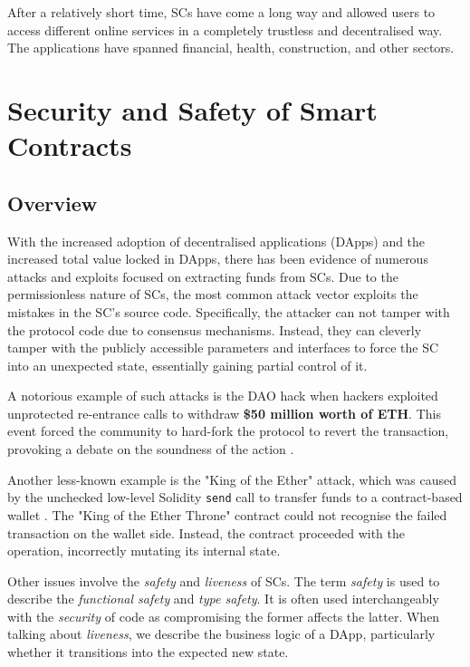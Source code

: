\documentclass[oneside]{ecsproject}     %
\begin{document}
After a relatively short time, SCs have come a long way and allowed users to access different online services in a completely trustless and decentralised way.
The applications have spanned financial, health, construction\cite{cad_blockchain}, and other sectors. 

\chapter{Security and Safety of Smart Contracts}

\section{Overview}

With the increased adoption of decentralised applications (DApps) and the increased total value locked in DApps, 
there has been evidence of numerous attacks and exploits focused on extracting funds from SCs. 
Due to the permissionless nature of SCs, the most common attack vector exploits the mistakes in the SC's source code.
Specifically, the attacker can not tamper with the protocol code due to consensus mechanisms.
Instead, they can cleverly tamper with the publicly accessible parameters and interfaces to force the SC into an unexpected state, essentially gaining partial control of it.

A notorious example of such attacks is the DAO hack when hackers exploited unprotected re-entrance calls to withdraw \textbf{\$50 million worth of ETH}. 
This event forced the community to hard-fork the protocol to revert the transaction, provoking a debate on the soundness of the action \cite{the_dao}.

Another less-known example is the "King of the Ether" attack, which was caused by the unchecked low-level Solidity \texttt{send} call to transfer funds to a contract-based wallet \cite{king_of_the_ether}.
The "King of the Ether Throne" contract could not recognise the failed transaction on the wallet side. Instead, the contract proceeded with the operation, incorrectly mutating its internal state.

Other issues involve the \textit{safety} and \textit{liveness} of SCs. 
The term \textit{safety} is used to describe the \textit{functional safety} and \textit{type safety}. It is often used interchangeably with the \textit{security} of code
as compromising the former affects the latter. When talking about \textit{liveness}, we describe the business logic of a DApp, particularly whether it transitions into the expected new state.
\end{document}
